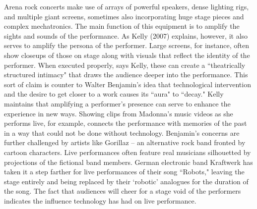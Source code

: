 Arena rock concerts make use of arrays of powerful speakers, dense lighting rigs, and multiple giant screens, sometimes also incorporating huge stage pieces and complex mechatronics. The main function of this equipment is to amplify the sights and sounds of the performance. As Kelly (2007) explains, however, it also serves to amplify the persona of the performer. Large screens, for instance, often show closeups of those on stage along with visuals that reflect the identity of the performer. When executed properly, says Kelly, these can create a ``theatrically structured intimacy" that draws the audience deeper into the performance. This sort of claim is counter to Walter Benjamin's idea that technological intervention and the desire to get closer to a work causes its ``aura" to ``decay." Kelly maintains that amplifying a performer's presence can serve to enhance the experience in new ways. Showing clips from Madonna's music videos as she performs live, for example, connects the performance with memories of the past in a way that could not be done without technology. Benjamin's concerns are further challenged by artists like Gorillaz -- an alternative rock band fronted by cartoon characters. Live performances often feature real musicians silhouetted by projections of the fictional band members. German electronic band Kraftwerk has taken it a step farther for live performances of their song ``Robots," leaving the stage entirely and being replaced by their `robotic' analogues for the duration of the song. The fact that audiences will cheer for a stage void of the performers indicates the influence technology has had on live performance. %
